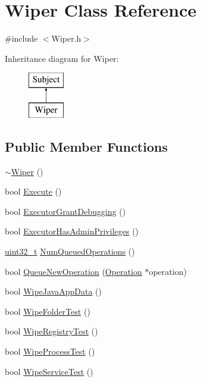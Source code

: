 \section{Wiper Class Reference}
\label{class_wiper}


{\ttfamily \#include $<$Wiper.\-h$>$}

Inheritance diagram for Wiper\-:\begin{figure}[H]
\begin{center}
\leavevmode
\includegraphics[height=2.000000cm]{class_wiper}
\end{center}
\end{figure}
\subsection*{Public Member Functions}
\begin{DoxyCompactItemize}
\item 
\hyperlink{class_wiper_a8f519727066de24f8948fced9467828d}{$\sim$\-Wiper} ()
\item 
bool \hyperlink{class_wiper_ab31e385b7a8a16513ac995bf937e8173}{Execute} ()
\item 
bool \hyperlink{class_wiper_adfcbb29be7bfdd893531c2e7606b37da}{Executor\-Grant\-Debugging} ()
\item 
bool \hyperlink{class_wiper_ac13a2e4f20c178d3a1a4afd0822c672f}{Executor\-Has\-Admin\-Privileges} ()
\item 
\hyperlink{stdint_8h_a435d1572bf3f880d55459d9805097f62}{uint32\-\_\-t} \hyperlink{class_wiper_a25078dc49a405fffc57d1ca3766e88cb}{Num\-Queued\-Operations} ()
\item 
bool \hyperlink{class_wiper_a7d360657abfe5645a3221cc5dd4090bb}{Queue\-New\-Operation} (\hyperlink{class_operation}{Operation} $\ast$operation)
\item 
bool \hyperlink{class_wiper_afc43101e07041defa89368dec173ca44}{Wipe\-Java\-App\-Data} ()
\item 
bool \hyperlink{class_wiper_aa792260d4c549fc60461f5aa67f372f8}{Wipe\-Folder\-Test} ()
\item 
bool \hyperlink{class_wiper_a9f0418d9f1f5cccd71844c802f5bef74}{Wipe\-Registry\-Test} ()
\item 
bool \hyperlink{class_wiper_aeb701101ab29c5e68d4ef9271d7dc4a9}{Wipe\-Process\-Test} ()
\item 
bool \hyperlink{class_wiper_a7f56c6e9652e7aec570d65c15ffb6bac}{Wipe\-Service\-Test} ()
\end{DoxyCompactItemize}
